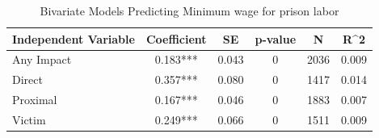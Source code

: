 \begin{table}

\caption{\label{tab:tab:q25_2_rev_bivariate}Bivariate Models Predicting Minimum wage for prison labor}
\centering
\begin{tabular}[t]{lccccc}
\toprule
Independent Variable & Coefficient & SE & p-value & N & R\textasciicircum{}2\\
\midrule
Any Impact & 0.183*** & 0.043 & 0 & 2036 & 0.009\\
Direct & 0.357*** & 0.080 & 0 & 1417 & 0.014\\
Proximal & 0.167*** & 0.046 & 0 & 1883 & 0.007\\
Victim & 0.249*** & 0.066 & 0 & 1511 & 0.009\\
\bottomrule
\end{tabular}
\end{table}
